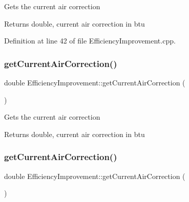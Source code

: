 Gets the current air correction

\begin{DoxyReturn}{Returns}
double, current air correction in btu 
\end{DoxyReturn}


Definition at line 42 of file Efficiency\+Improvement.\+cpp.

\mbox{\label{class_efficiency_improvement_a640d0f4f9ecc8267678aa85bbafba655}} 
\subsubsection{\texorpdfstring{get\+Current\+Air\+Correction()}{getCurrentAirCorrection()}\hspace{0.1cm}{\footnotesize\ttfamily [2/3]}}
{\footnotesize\ttfamily double Efficiency\+Improvement\+::get\+Current\+Air\+Correction (\begin{DoxyParamCaption}{ }\end{DoxyParamCaption})}

Gets the current air correction

\begin{DoxyReturn}{Returns}
double, current air correction in btu 
\end{DoxyReturn}
\mbox{\label{class_efficiency_improvement_a640d0f4f9ecc8267678aa85bbafba655}} 
\subsubsection{\texorpdfstring{get\+Current\+Air\+Correction()}{getCurrentAirCorrection()}\hspace{0.1cm}{\footnotesize\ttfamily [3/3]}}
{\footnotesize\ttfamily double Efficiency\+Improvement\+::get\+Current\+Air\+Correction (\begin{DoxyParamCaption}{ }\end{DoxyParamCaption})}

